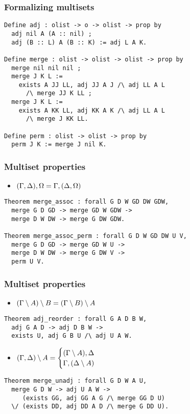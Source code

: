 \documentclass{beamer}
\begin{document}
\begin{frame}[fragile]
  \frametitle{Formalizing multisets}

  \begin{lstlisting}
Define adj : olist -> o -> olist -> prop by
  adj nil A (A :: nil) ;
  adj (B :: L) A (B :: K) := adj L A K.

Define merge : olist -> olist -> olist -> prop by
  merge nil nil nil ;
  merge J K L :=
    exists A JJ LL, adj JJ A J /\ adj LL A L
      /\ merge JJ K LL ;
  merge J K L :=
    exists A KK LL, adj KK A K /\ adj LL A L
      /\ merge J KK LL.

Define perm : olist -> olist -> prop by
  perm J K := merge J nil K.
  \end{lstlisting}
\end{frame}

\begin{frame}[fragile]
  \frametitle{Multiset properties}

  \begin{itemize}
  \item $(\Gamma, \Delta), \Omega = \Gamma, (\Delta, \Omega)$
  \end{itemize}

\begin{lstlisting}
Theorem merge_assoc : forall G D W GD DW GDW,
  merge G D GD -> merge GD W GDW ->
  merge D W DW -> merge G DW GDW.

Theorem merge_assoc_perm : forall G D W GD DW U V,
  merge G D GD -> merge GD W U ->
  merge D W DW -> merge G DW V ->
  perm U V.
\end{lstlisting}

\end{frame}

\begin{frame}
  \frametitle{Multiset properties}

  \begin{itemize}
  \item $(\Gamma \setminus A) \setminus B = (\Gamma \setminus B) \setminus A$
  \end{itemize}

\begin{lstlisting}
Theorem adj_reorder : forall G A D B W,
  adj G A D -> adj D B W ->
  exists U, adj G B U /\ adj U A W.
\end{lstlisting}

  \pause

  \begin{itemize}
  \item $(\Gamma,\Delta) \setminus A =
    \begin{cases}
      (\Gamma\setminus A), \Delta \\
      \Gamma, (\Delta\setminus A)
    \end{cases}$
  \end{itemize}

\begin{lstlisting}
Theorem merge_unadj : forall G D W A U,
  merge G D W -> adj U A W ->
     (exists GG, adj GG A G /\ merge GG D U)
  \/ (exists DD, adj DD A D /\ merge G DD U).
\end{lstlisting}

\end{frame}
\end{document}
